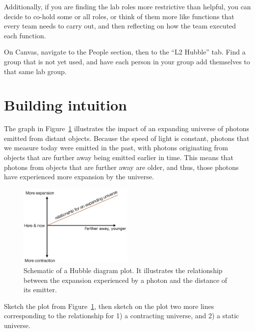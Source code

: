 Additionally, if you are finding the lab roles more restrictive than helpful, you can decide to co-hold some or all roles, or think of them more like functions that every team needs to carry out, and then reflecting on how the team executed each function.

\begin{steps}
	\item On Canvas, navigate to the People section, then to the ``L2 Hubble'' tab. Find a group that is not yet used, and have each person in your group add themselves to that same lab group.
\end{steps}

\section{Building intuition}

The graph in Figure~\ref{hd:fig:hubble-diagram-schematic} illustrates the impact of an expanding universe of
photons emitted from distant objects. Because the speed of light is
constant, photons that we measure today were emitted in the past, with
photons originating from objects that are further away being emitted
earlier in time. This means that photons from objects that are further
away are older, and thus, those photons have experienced more expansion by the universe.

\begin{figure}
	\centering
	\includegraphics[width=0.5\textwidth]{hubble-diagram/hubble-diagram-schematic}
	\caption{Schematic of a Hubble diagram plot. It illustrates the relationship between the expansion
		experienced by a photon and the distance of its emitter.}\label{hd:fig:hubble-diagram-schematic}
\end{figure}

\begin{steps}
	\item\label{hd:step:sketch} Sketch the plot from Figure~\ref{hd:fig:hubble-diagram-schematic}, then sketch on the plot two more lines corresponding to the
	relationship for 1) a contracting universe, and 2) a static universe.
\end{steps}

